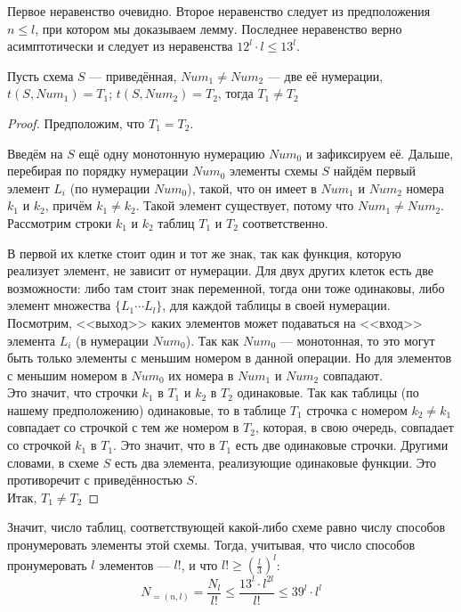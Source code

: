 Первое неравенство очевидно. Второе неравенство следует из предположения $n\leq l$, при котором мы доказываем лемму. Последнее неравенство верно асимптотически и следует из неравенства $12^l\cdot l\leq 13^l$.
\begin{statement}
Пусть схема $S$ --- приведённая, $Num_1 \neq Num_2$ --- две её нумерации, $t(S, Num_1)= T_1$;  $t(S, Num_2)= T_2$, тогда $T_1 \neq T_2$
\end{statement}
\begin{proof}
Предположим, что $T_1 = T_2$.

Введём на $S$ ещё одну монотонную нумерацию $Num_0$ и зафиксируем её. Дальше, перебирая по порядку нумерации $Num_0$ элементы схемы $S$ найдём первый элемент $L_i$ (по нумерации $Num_0$), такой, что он имеет в $Num_1$ и $Num_2$ номера $k_1$ и $k_2$, причём $k_1 \neq k_2$. Такой элемент существует, потому что $Num_1 \neq Num_2$. Рассмотрим строки $k_1$ и $k_2$ таблиц $T_1$ и $T_2$ соответственно. 

В первой их клетке стоит один и тот же знак, так как функция, которую реализует элемент, не зависит от нумерации. Для двух других клеток есть две возможности: либо там стоит знак переменной, тогда они тоже одинаковы, либо элемент множества $\{ L_1 \cdots L_l\} $, для каждой таблицы в своей нумерации. \\
Посмотрим, <<выход>> каких элементов может подаваться на <<вход>> элемента $L_i$ (в нумерации $Num_0$). Так как $Num_0$ --- монотонная, то  это могут быть только элементы с меньшим номером в данной операции.  Но для элементов с меньшим номером в $Num_0$ их номера в $Num_1$ и $Num_2$ совпадают. \\
Это значит, что строчки $k_1$ в $T_1$ и $k_2$ в $T_2$ одинаковые. Так как таблицы (по нашему предположению) одинаковые, то в таблице $T_1$ строчка с номером $k_2 \neq k_1$ совпадает со строчкой с тем же номером в $T_2$, которая, в свою очередь, совпадает со строчкой $k_1$ в $T_1$. Это значит, что в $T_1$ есть две одинаковые строчки. Другими словами, в схеме $S$ есть два элемента, реализующие одинаковые функции. Это противоречит с приведённостью $S$.\\
Итак, $T_1 \neq T_2$
\end{proof}
Значит, число таблиц, соответствующей какой-либо схеме равно числу способов пронумеровать элементы этой схемы.
Тогда, учитывая, что число способов пронумеровать $l$ элементов --- $l!$, и что $l! \geq (\frac{l}{3})^l $:\\
$$ N_{=(n,l)}=\frac{N_l}{l!} \leq \frac{13^l\cdot l^{2l}}{l!} \leq 39^l\cdot l^l $$\\
